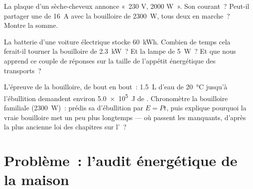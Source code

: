 \begin{exercise}[$\star\star$]\label{exo:g9:electric-power-energy:10}
La plaque d'un sèche-cheveux annonce «~230 V, 2000 W~». Son courant~?
Peut-il partager une  de \qty{16}{A} avec la bouilloire de
\qty{2300}{W}, tous deux en marche~? Montre la somme.
\end{exercise}

\begin{exercise}[$\star\star$]\label{exo:g9:electric-power-energy:11}
La batterie d'une voiture électrique stocke \qty{60}{kWh}. Combien de
temps cela ferait-il tourner la bouilloire de \qty{2.3}{kW}~? Et la
lampe de \qty{5}{W}~? Et que nous apprend ce couple de réponses sur la
taille de l'appétit énergétique des transports~?
\end{exercise}

\begin{exercise}[$\star\star\star$]\label{exo:g9:electric-power-energy:12}
L'épreuve de la bouilloire, de bout en bout~: \qty{1.5}{L} d'eau de
\qty{20}{\celsius} jusqu'à l'ébullition demandent environ
\qty{5.0e5}{J} de . Chronomètre la bouilloire familiale
(\qty{2300}{W})~: prédis sa  d'ébullition par $E = P t$, puis
explique pourquoi la vraie bouilloire met un peu plus longtemps ---
où passent les  manquants, d'après la plus ancienne loi des
chapitres sur l'~?
\end{exercise}

\section{Problème~: l'audit énergétique de la maison}

